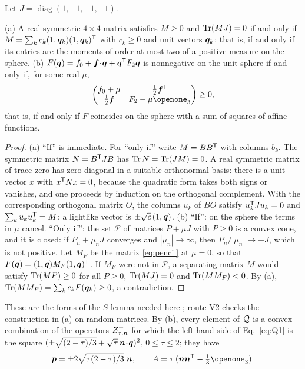 Let $J=\operatorname{diag}(1,-1,-1,-1)$.

\begin{lemma}
\label{lem:sos}
(a) A real symmetric $4\times4$ matrix satisfies $M\ge0$ and $\operatorname{Tr}(MJ)=0$ if and only if $M=\sum_kc_k(1,\bm{q}_k)(1,\bm{q}_k)^{\mathsf{T}}$ with $c_k\ge0$ and unit vectors $\bm{q}_k$; that is, if and only if its entries are the moments of order at most two of a positive measure on the sphere.
(b) $F(\bm{q})=f_0+\bm{f}\!\cdot\!\bm{q}+\bm{q}^{\mathsf{T}}F_2\bm{q}$ is nonnegative on the unit sphere if and only if, for some real $\mu$,
\begin{equation}
\begin{pmatrix}f_0+\mu&\tfrac12\bm{f}^{\T}\\ \tfrac12\bm{f}&F_2-\mu\openone_3\end{pmatrix}\ge0 ,
\label{eq:pencil}
\end{equation}
that is, if and only if $F$ coincides on the sphere with a sum of squares of affine functions.
\end{lemma}

\begin{proof}
(a) ``If'' is immediate. For ``only if'' write $M=BB^{\mathsf{T}}$ with columns $b_k$. The symmetric matrix $N=B^{\mathsf{T}}JB$ has $\operatorname{Tr} N=\operatorname{Tr}(JM)=0$. A real symmetric matrix of trace zero has zero diagonal in a suitable orthonormal basis: there is a unit vector $x$ with $x^{\mathsf{T}}Nx=0$, because the quadratic form takes both signs or vanishes, and one proceeds by induction on the orthogonal complement. With the corresponding orthogonal matrix $O$, the columns $u_k$ of $BO$ satisfy $u_k^{\mathsf{T}}Ju_k=0$ and $\sum_ku_ku_k^{\mathsf{T}}=M$; a lightlike vector is $\pm\sqrt{c}\,(1,\bm{q})$.
(b) ``If'': on the sphere the terms in $\mu$ cancel. ``Only if'': the set $\mathcal{P}$ of matrices $P+\mu J$ with $P\ge0$ is a convex cone, and it is closed: if $P_n+\mu_nJ$ converges and $|\mu_n|\to\infty$, then $P_n/|\mu_n|\to\mp J$, which is not positive. Let $M_F$ be the matrix \eqref{eq:pencil} at $\mu=0$, so that $F(\bm{q})=(1,\bm{q})M_F(1,\bm{q})^{\mathsf{T}}$. If $M_F$ were not in $\mathcal{P}$, a separating matrix $M$ would satisfy $\operatorname{Tr}(MP)\ge0$ for all $P\ge0$, $\operatorname{Tr}(MJ)=0$ and $\operatorname{Tr}(MM_F)<0$. By (a), $\operatorname{Tr}(MM_F)=\sum_kc_kF(\bm{q}_k)\ge0$, a contradiction.
\end{proof}

These are the forms of the $S$-lemma needed here \cite{sturm2003,polik2007}; route V2 checks the construction in (a) on random matrices. By (b), every element of $\mathcal{Q}$ is a convex combination of the operators $Z_{\tau,\bm{n}}^{\pm}$ for which the left-hand side of Eq.~\eqref{eq:Q1} is the square $(\pm\sqrt{(2-\tau)/3}+\sqrt\tau\,\bm{n}\!\cdot\!\bm{q})^2$, $0\le\tau\le2$; they have
\begin{equation}
\bp=\pm2\sqrt{\tau(2-\tau)/3}\;\bn,\qquad A=\tau\,(\bn\bn^{\T}-\tfrac13\openone_3).
\label{eq:squares}
\end{equation}

